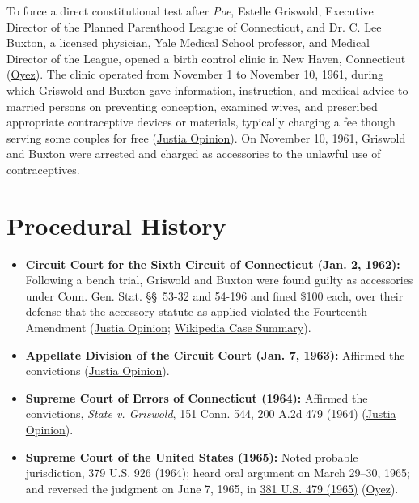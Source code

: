\documentclass[12pt]{article}
\begin{document}
To force a direct constitutional test after \textit{Poe}, Estelle Griswold, Executive Director of the Planned Parenthood League of Connecticut, and Dr. C. Lee Buxton, a licensed physician, Yale Medical School professor, and Medical Director of the League, opened a birth control clinic in New Haven, Connecticut (\href{https://www.oyez.org/cases/1964/496}{Oyez}). The clinic operated from November 1 to November 10, 1961, during which Griswold and Buxton gave information, instruction, and medical advice to married persons on preventing conception, examined wives, and prescribed appropriate contraceptive devices or materials, typically charging a fee though serving some couples for free (\href{https://supreme.justia.com/cases/federal/us/381/479/}{Justia Opinion}). On November 10, 1961, Griswold and Buxton were arrested and charged as accessories to the unlawful use of contraceptives.

\section{Procedural History}
\begin{itemize}
    \item \textbf{Circuit Court for the Sixth Circuit of Connecticut (Jan. 2, 1962):} Following a bench trial, Griswold and Buxton were found guilty as accessories under Conn. Gen. Stat. \S\S~53-32 and 54-196 and fined \$100 each, over their defense that the accessory statute as applied violated the Fourteenth Amendment (\href{https://supreme.justia.com/cases/federal/us/381/479/}{Justia Opinion}; \href{https://en.wikipedia.org/wiki/Griswold_v._Connecticut}{Wikipedia Case Summary}).
    \item \textbf{Appellate Division of the Circuit Court (Jan. 7, 1963):} Affirmed the convictions (\href{https://supreme.justia.com/cases/federal/us/381/479/}{Justia Opinion}).
    \item \textbf{Supreme Court of Errors of Connecticut (1964):} Affirmed the convictions, \textit{State v. Griswold}, 151 Conn. 544, 200 A.2d 479 (1964) (\href{https://supreme.justia.com/cases/federal/us/381/479/}{Justia Opinion}).
    \item \textbf{Supreme Court of the United States (1965):} Noted probable jurisdiction, 379 U.S. 926 (1964); heard oral argument on March 29--30, 1965; and reversed the judgment on June 7, 1965, in \href{https://www.courtlistener.com/opinion/107082/griswold-v-connecticut/}{381 U.S. 479 (1965)} (\href{https://www.oyez.org/cases/1964/496}{Oyez}).
\end{itemize}
\end{document}

